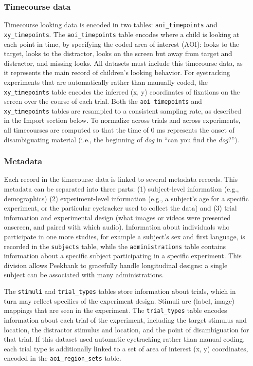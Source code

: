 \documentclass[
  english,
  man,floatsintext]{apa6}
\begin{document}
\hypertarget{timecourse-data}{%
\subsubsection{Timecourse data}\label{timecourse-data}}

Timecourse looking data is encoded in two tables: \texttt{aoi\_timepoints} and \texttt{xy\_timepoints}.
The \texttt{aoi\_timepoints} table encodes where a child is looking at each point in time, by specifying the coded area of interest (AOI): looks to the target, looks to the distractor, looks on the screen but away from target and distractor, and missing looks.
All datasets must include this timecourse data, as it represents the main record of children's looking behavior.
For eyetracking experiments that are automatically rather than manually coded, the \texttt{xy\_timepoints} table encodes the inferred (x, y) coordinates of fixations on the screen over the course of each trial.
Both the \texttt{aoi\_timepoints} and \texttt{xy\_timepoints} tables are resampled to a consistent sampling rate, as described in the Import section below.
To normalize across trials and across experiments, all timecourses are computed so that the time of 0 ms represents the onset of disambiguating material (i.e., the beginning of \textit{dog} in ``can you find the \textit{dog}?'').

\hypertarget{metadata}{%
\subsubsection{Metadata}\label{metadata}}

Each record in the timecourse data is linked to several metadata records.
This metadata can be separated into three parts: (1) subject-level information (e.g., demographics) (2) experiment-level information (e.g., a subject's age for a specific experiment, or the particular eyetracker used to collect the data) and (3) trial information and experimental design (what images or videos were presented onscreen, and paired with which audio).
Information about individuals who participate in one more studies, for example a subject's sex and first language, is recorded in the \texttt{subjects} table, while the \texttt{administrations} table contains information about a specific subject participating in a specific experiment.
This division allows Peekbank to gracefully handle longitudinal designs: a single subject can be associated with many administrations.

The \texttt{stimuli} and \texttt{trial\_types} tables store information about trials, which in turn may reflect specifics of the experiment design.
Stimuli are (label, image) mappings that are seen in the experiment.
The \texttt{trial\_types} table encodes information about each trial of the experiment, including the target stimulus and location, the distractor stimulus and location, and the point of disambiguation for that trial.
If this dataset used automatic eyetracking rather than manual coding, each trial type is additionally linked to a set of area of interest (x, y) coordinates, encoded in the \texttt{aoi\_region\_sets} table.
\end{document}

